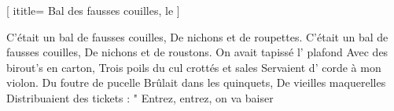  [
ititle= {Bal des fausses couilles, le} ]

\beginverse
C'était un bal de fausses couilles,
De nichons et de roupettes.
C'était un bal de fausses couilles,
De nichons et de roustons.
On avait tapissé l' plafond
Avec des birout's en carton,
Trois poils du cul crottés et sales
Servaient d' corde à mon violon.
Du foutre de pucelle
Brûlait dans les quinquets,
De vieilles maquerelles
Distribuaient des tickets :
" Entrez, entrez, on va baiser
\endverse

\endsong